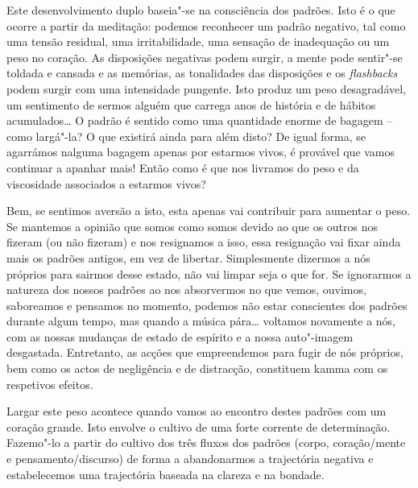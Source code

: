 Este desenvolvimento duplo baseia"-se na consciência dos padrões. Isto é o que
ocorre a partir da meditação: podemos reconhecer um padrão negativo, tal como
uma tensão residual, uma irritabilidade, uma sensação de inadequação ou um peso
no coração. As disposições negativas podem surgir, a mente pode sentir"-se
toldada e cansada e as memórias, as tonalidades das disposições e os
\emph{flashbacks} podem surgir com uma intensidade pungente. Isto produz um peso
desagradável, um sentimento de sermos alguém que carrega anos de história e de
hábitos acumulados\ldots{} O padrão é sentido como uma quantidade enorme de bagagem
-- como largá"-la? O que existirá ainda para além disto? De igual forma, se
agarrámos nalguma bagagem apenas por estarmos vivos, é provável que vamos
continuar a apanhar mais! Então como é que nos livramos do peso e da viscosidade
associados a estarmos vivos?

Bem, se sentimos aversão a isto, esta apenas vai contribuir para aumentar o
peso. Se mantemos a opinião que somos como somos devido ao que os outros nos
fizeram (ou não fizeram) e nos resignamos a isso, essa resignação vai fixar
ainda mais os padrões antigos, em vez de libertar. Simplesmente dizermos a nós
próprios para sairmos desse estado, não vai limpar seja o que for. Se ignorarmos
a natureza dos nossos padrões ao nos absorvermos no que vemos, ouvimos,
saboreamos e pensamos no momento, podemos não estar conscientes dos padrões
durante algum tempo, mas quando a música pára\ldots{} voltamos novamente a nós, com
as nossas mudanças de estado de espírito e a nossa auto"-imagem desgastada.
Entretanto, as acções que empreendemos para fugir de nós próprios, bem como os
actos de negligência e de distracção, constituem kamma com os respetivos
efeitos.

Largar este peso acontece quando vamos ao encontro destes padrões com um coração
grande.
Isto envolve o cultivo de uma forte corrente de determinação. Fazemo"-lo a partir
do cultivo dos três fluxos dos padrões (corpo, coração/mente e
pensamento/discurso) de forma a abandonarmos a trajectória negativa e
estabelecemos uma trajectória baseada na clareza e na bondade.


